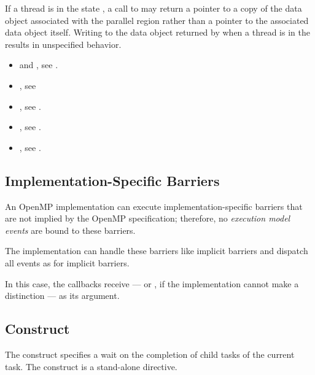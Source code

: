 \restrictions

If a thread is in the state , 
a call to  may return a pointer to a copy of the 
data object associated with the parallel region rather than a pointer to 
the associated data object itself. Writing to the data object 
returned by  when a thread is in the 
 results in unspecified behavior.

\crossreferences
\begin{itemize}

\item {} and , see
  .

\item {}, see

\item {}, see
  .

\item {}, see
  .

\item {}, see
  .

\end{itemize}


\subsection{Implementation-Specific Barriers}
\label{subsec:implementation-specific-barrier}

An OpenMP implementation can execute implementation-specific barriers
that are not implied by the OpenMP specification; therefore, no \emph{execution
model events} are bound to these barriers.

The implementation can handle these barriers like implicit barriers and
dispatch all events as for implicit barriers. 

In this case, the callbacks receive
 --- or
, if the implementation cannot make a
distinction --- as its  argument.





\subsection{ Construct}
\label{subsec:taskwait Construct}
\summary
The  construct specifies a wait on the completion of child tasks
of the current task. The  construct is a stand-alone directive.

